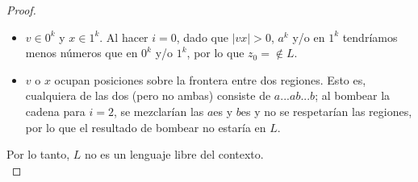\documentclass[letterpaper,11pt]{article}
\begin{document}
\begin{enumerate}
\begin{itemize}
\begin{proof}
\begin{itemize}
\begin{itemize}
                       \item $v \in 0^{k}$ y $x \in 1^{k}$. Al hacer $i = 0$, 
                       dado que $|vx| >  0$, $a^{k}$ y/o en $1^{k}$ tendríamos menos
                       números que en $0^{k}$ y/o $1^{k}$, por lo que $z_0 = \notin L$.
                       
                       
                       \item $v$ o $x$ ocupan posiciones sobre la frontera entre dos regiones.
                       Esto es, cualquiera de las dos (pero no ambas) consiste de $a...ab...b$;
                       al bombear la cadena para $i = 2$, se mezclarían las $a$es y $b$es y no
                       se respetarían las regiones, por lo que el resultado de bombear no estaría
                       en $L$.
                   \end{itemize}
                   
               \end{itemize}
               Por lo tanto, $L$ no es un lenguaje libre del contexto. \\
           \end{proof}
        \end{itemize}


\end{enumerate}
\end{document}
